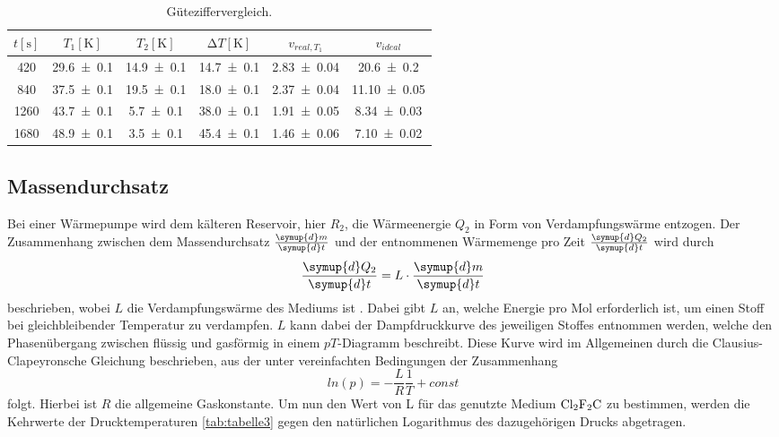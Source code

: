 \begin{table}[H]
  \centering
  \caption{Güteziffervergleich.}
  \label{tab:tabelle2}
\begin{tabular}{c c c c c c}
  \toprule
  {$t [\si{\second}]$} & {$T_1 [\si{\kelvin}]$} & {$T_2 [\si{\kelvin}]$} & {$\increment{T} [\si{\kelvin}]$} & {$v_{real, T_1}$} & {$v_{ideal}$}\\
  \midrule
  \num{420} & \num{29.6 +- 0.1} & \num{14.9 +- 0.1} & \num{14.7 +- 0.1} & \num{2.83 +- 0.04} & \num{20.6 +- 0.2} \\
  \num{840} & \num{37.5 +- 0.1} & \num{19.5 +- 0.1} & \num{18.0 +- 0.1} & \num{2.37 +- 0.04} & \num{11.10 +- 0.05}  \\
  \num{1260} & \num{43.7 +- 0.1} & \num{5.7 +- 0.1} & \num{38.0 +- 0.1} & \num{1.91 +- 0.05} & \num{8.34 +- 0.03}  \\
  \num{1680} & \num{48.9 +- 0.1} & \num{3.5 +- 0.1} & \num{45.4 +- 0.1} & \num{1.46 +- 0.06} & \num{7.10 +- 0.02}  \\
  \bottomrule
\end{tabular}
\end{table}

\subsection{Massendurchsatz}
Bei einer Wärmepumpe wird dem kälteren Reservoir, hier $R_2$, die Wärmeenergie $Q_2$ in Form von Verdampfungswärme entzogen.
Der Zusammenhang zwischen dem Massendurchsatz $\frac{\symup{d} m}{\symup{d} t}$ und der entnommenen Wärmemenge pro Zeit $\frac{\symup{d} Q_2}{\symup{d} t}$ wird durch
\begin{equation}
  \frac{\symup{d} Q_2}{\symup{d}t} = L \cdot \frac{\symup{d} m}{\symup{d} t}
    \label{eqn:md}
\end{equation}
beschrieben, wobei $L$ die Verdampfungswärme des Mediums ist \cite{V203}.
Dabei gibt $L$ an, welche Energie pro Mol erforderlich ist, um einen Stoff bei gleichbleibender Temperatur zu verdampfen.
$L$ kann dabei der Dampfdruckkurve des jeweiligen Stoffes entnommen werden, welche den Phasenübergang zwischen flüssig und gasförmig in einem $pT$-Diagramm beschreibt.
Diese Kurve wird im Allgemeinen durch die Clausius-Clapeyronsche Gleichung beschrieben, aus der unter vereinfachten Bedingungen der Zusammenhang
\begin{equation}
  ln(p)= -\frac{L}{R}\frac{1}{T} + const
  \label{eqn:ccg}
\end{equation}
folgt.
Hierbei ist $R$ die allgemeine Gaskonstante.
Um nun den Wert von L für das genutzte Medium $\ce{Cl2F2C}$ zu bestimmen, werden die Kehrwerte der Drucktemperaturen \ref{tab:tabelle3} gegen den natürlichen Logarithmus des dazugehörigen Drucks abgetragen.

